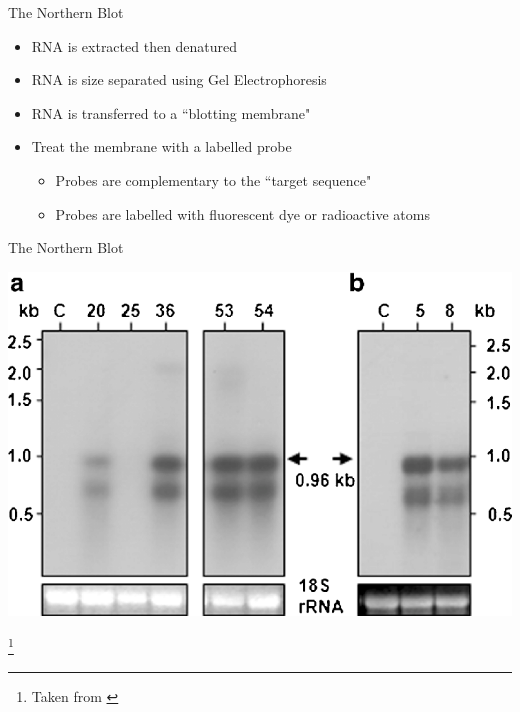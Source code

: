 \documentclass[aspectratio=169,11pt]{beamer}
\newcommand\blfootnote[1]{%
  \begingroup
  \renewcommand\thefootnote{}\footnote{#1}%
  \addtocounter{footnote}{-1}%
  \endgroup
}
\begin{document}
\begin{frame}{The Northern Blot}

	\begin{itemize}
		\item RNA is extracted then denatured
		\item RNA is size separated using Gel Electrophoresis
		\item RNA is transferred to a ``blotting membrane"
		\item Treat the membrane with a labelled probe
		\begin{itemize}
			\item Probes are complementary to the ``target sequence"
			\item Probes are labelled with fluorescent dye or radioactive atoms
		\end{itemize}
	\end{itemize}

\end{frame}

\begin{frame}{The Northern Blot}

	\begin{center}
		\includegraphics[scale=0.3]{figures/northern.png} 
	\end{center}

\blfootnote{Taken from \cite{pmid25648206}}	

\end{frame}
\end{document}
